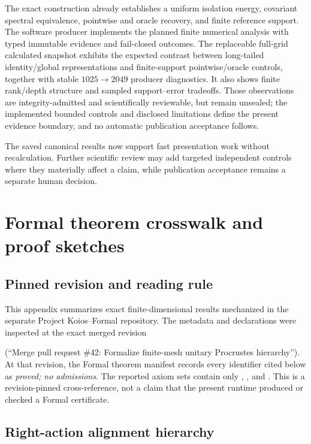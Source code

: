 \documentclass[11pt]{article}
\begin{document}
The exact construction already establishes a uniform isolation energy, covariant
spectral equivalence, pointwise and oracle recovery, and finite reference support. The
software producer implements the planned finite numerical analysis with typed immutable
evidence and fail-closed outcomes. The replaceable full-grid calculated snapshot
exhibits the expected contrast between long-tailed identity/global representations and
finite-support pointwise/oracle controls, together with stable
$1025\rightarrow2049$ producer diagnostics. It also shows finite rank/depth structure
and sampled support--error tradeoffs. Those observations are integrity-admitted and
scientifically reviewable, but remain unsealed; the implemented bounded controls and
disclosed limitations define the present evidence boundary, and no automatic publication
acceptance follows.

The saved canonical results now support fast presentation work without recalculation.
Further scientific review may add targeted independent controls where they materially
affect a claim, while publication acceptance remains a separate human decision.

\appendix

\section{Formal theorem crosswalk and proof sketches}
\label{app:formal-crosswalk}

\subsection{Pinned revision and reading rule}

This appendix summarizes exact finite-dimensional results mechanized in the separate
Project Koios--Formal repository. The metadata and declarations were inspected at the
exact merged revision
\begin{center}
\end{center}
(``Merge pull request \#42: Formalize finite-mesh unitary Procrustes hierarchy''). At
that revision, the Formal theorem manifest records every identifier cited below as
\emph{proved; no admissions}. The reported axiom sets contain only
, , and . This is a revision-pinned
cross-reference, not a claim that the present runtime produced or checked a Formal
certificate.

\subsection{Right-action alignment hierarchy}
\end{document}
